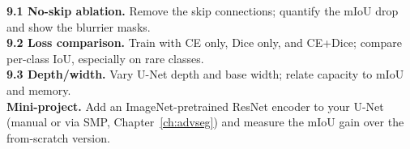 \begin{exbox}
\textbf{9.1 No-skip ablation.} Remove the skip connections; quantify the mIoU
drop and show the blurrier masks.\\[2pt]
\textbf{9.2 Loss comparison.} Train with CE only, Dice only, and CE+Dice; compare
per-class IoU, especially on rare classes.\\[2pt]
\textbf{9.3 Depth/width.} Vary U-Net depth and base width; relate capacity to
mIoU and memory.\\[2pt]
\textbf{Mini-project.} Add an ImageNet-pretrained ResNet encoder to your U-Net
(manual or via SMP, Chapter~\ref{ch:advseg}) and measure the mIoU gain over the
from-scratch version.
\end{exbox}
